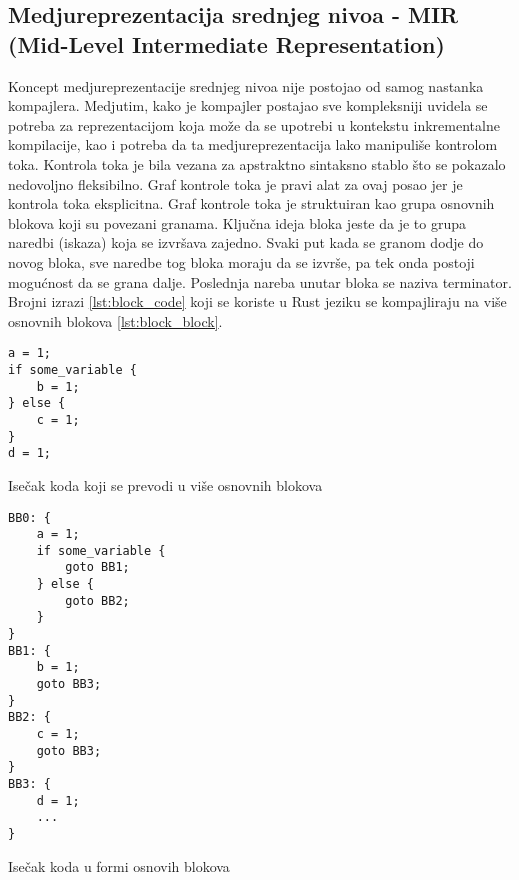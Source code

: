 \subsection{Medjureprezentacija srednjeg nivoa - MIR (Mid-Level Intermediate Representation)}

Koncept medjureprezentacije srednjeg nivoa nije postojao od samog nastanka kompajlera. Medjutim,
kako je kompajler postajao sve kompleksniji uvidela se potreba za reprezentacijom koja može da 
se upotrebi u kontekstu inkrementalne kompilacije, kao i potreba da ta medjureprezentacija lako manipuliše 
kontrolom toka. Kontrola toka je bila vezana za apstraktno sintaksno stablo što se pokazalo nedovoljno fleksibilno. 
Graf kontrole toka je pravi alat za ovaj posao jer je kontrola toka eksplicitna. Graf kontrole toka je 
struktuiran kao grupa osnovnih blokova koji su povezani granama. Ključna ideja bloka jeste da je to grupa naredbi (iskaza) 
koja se izvršava zajedno. Svaki put kada se granom dodje do novog bloka, sve naredbe tog bloka moraju da se izvrše, pa tek onda postoji mogućnost 
da se grana dalje. Poslednja nareba unutar bloka se naziva terminator. Brojni izrazi \ref{lst:block_code} koji se koriste u Rust jeziku se kompajliraju na 
više osnovnih blokova \ref{lst:block_block}.

\begin{listing}[H]
\begin{verbatim}
a = 1;
if some_variable {
    b = 1;
} else {
    c = 1;
}
d = 1;
\end{verbatim}
\caption{Isečak koda koji se prevodi u više osnovnih blokova}
\label{lst:block_code}
\end{listing}


\begin{listing}[H]
\begin{verbatim}
BB0: {
    a = 1;
    if some_variable {
        goto BB1;
    } else {
        goto BB2;
    }
}
BB1: {
    b = 1;
    goto BB3;
}
BB2: {
    c = 1;
    goto BB3;
}
BB3: {
    d = 1;
    ...
}
\end{verbatim}
\caption{Isečak koda u formi osnovih blokova}
\label{lst:block_block}
\end{listing}

